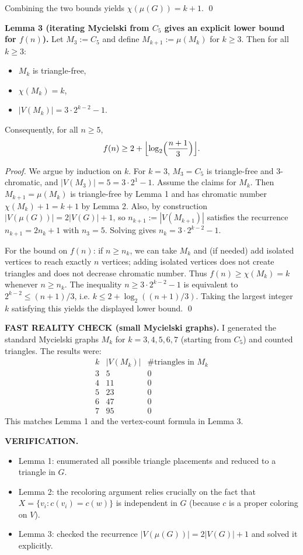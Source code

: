 Combining the two bounds yields $\chi(\mu(G))=k+1$. \qed

\medskip
\noindent\textbf{Lemma 3 (iterating Mycielski from $C_5$ gives an explicit lower bound for $f(n)$).}
Let $M_3:=C_5$ and define $M_{k+1}:=\mu(M_k)$ for $k\ge 3$.
Then for all $k\ge 3$:
\begin{itemize}
\item $M_k$ is triangle-free,
\item $\chi(M_k)=k$,
\item $|V(M_k)|=3\cdot 2^{k-2}-1$.
\end{itemize}
Consequently, for all $n\ge 5$,
\[f(n)\ge 2+\Bigl\lfloor \log_2\Bigl(\frac{n+1}{3}\Bigr)\Bigr\rfloor.
\]

\noindent\emph{Proof.}
We argue by induction on $k$.
For $k=3$, $M_3=C_5$ is triangle-free and $3$-chromatic, and $|V(M_3)|=5=3\cdot 2^{1}-1$.
Assume the claims for $M_k$.
Then $M_{k+1}=\mu(M_k)$ is triangle-free by Lemma 1 and has chromatic number $\chi(M_k)+1=k+1$ by Lemma 2.
Also, by construction $|V(\mu(G))|=2|V(G)|+1$, so $n_{k+1}:=|V(M_{k+1})|$ satisfies the recurrence $n_{k+1}=2n_k+1$ with $n_3=5$.
Solving gives $n_k=3\cdot 2^{k-2}-1$.

For the bound on $f(n)$: if $n\ge n_k$, we can take $M_k$ and (if needed) add isolated vertices to reach exactly $n$ vertices; adding isolated vertices does not create triangles and does not decrease chromatic number.
Thus $f(n)\ge \chi(M_k)=k$ whenever $n\ge n_k$.
The inequality $n\ge 3\cdot 2^{k-2}-1$ is equivalent to $2^{k-2}\le (n+1)/3$, i.e.
$k\le 2+\log_2((n+1)/3)$.
Taking the largest integer $k$ satisfying this yields the displayed lower bound. \qed

\medskip
\noindent\textbf{FAST REALITY CHECK (small Mycielski graphs).}
I generated the standard Mycielski graphs $M_k$ for $k=3,4,5,6,7$ (starting from $C_5$) and counted triangles.
The results were:
\[
\begin{array}{c|c|c}
 k & |V(M_k)| & \#\text{triangles in }M_k\\\hline
 3 & 5 & 0\\
 4 & 11 & 0\\
 5 & 23 & 0\\
 6 & 47 & 0\\
 7 & 95 & 0
\end{array}
\]
This matches Lemma 1 and the vertex-count formula in Lemma 3.

\medskip
\noindent\textbf{VERIFICATION.}
\begin{itemize}
\item Lemma 1: enumerated all possible triangle placements and reduced to a triangle in $G$.
\item Lemma 2: the recoloring argument relies crucially on the fact that $X=\{v_i:c(v_i)=c(w)\}$ is independent in $G$ (because $c$ is a proper coloring on $V$).
\item Lemma 3: checked the recurrence $|V(\mu(G))|=2|V(G)|+1$ and solved it explicitly.
\end{itemize}

